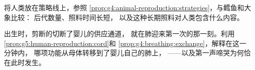 \begin{exercise}[$\star\star$]\label{exo:g5:human-reproduction:10}
将人类放在策略线上，参照
\cref{prop:g4:animal-reproduction:strategies}，与鳕鱼和大象比较：
后代数量、照料时间长短，
以及这种长期照料对人类包含什么内容。
\end{exercise}

\begin{exercise}[$\star\star\star$]\label{exo:g5:human-reproduction:11}
出生时，剪断的切断了婴儿的供应通道，
就在肺迎来第一次的那一刻。利用
\cref{prop:g5:human-reproduction:cord}和
\cref{prop:g4:breathing:exchange}，解释在这一分钟内，
哪项功能从母体转移到了婴儿自己的肺上，
——以及第一声啼哭为何恰在此时发生。
\end{exercise}
